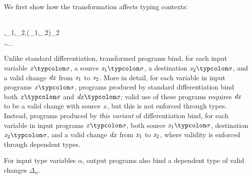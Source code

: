 We first show how the transformation affects typing contexts:
\begin{hscode}\SaveRestoreHook
{}%
%
%
\>[3]{}\Derive{\EmptyContext}\mathrel{=}\EmptyContext{}\<[E]%
\\
\>[3]{}\mathrel{=}\Derive{\Gamma},_{1}\typcolon\sigma,_{2}\typcolon\sigma,\typcolon(_{1},_{2})\in \Delta_2\mean{\sigma}{}\<[E]%
\\
\>[3]{}\Derive{\Gamma,\alpha\typcolon\star}\mathrel{=}\Derive{\Gamma},\alpha\typcolon\star,\Delta_\alpha\typcolon\alpha\to \alpha\to \star{}\<[E]%
\ColumnHook
\end{hscode}\resethooks
Unlike standard differentiation, transformed programs bind, for each input
variable \ensuremath{\Varid{x}\typcolon\sigma},
a source \ensuremath{\Varid{x}_{1}\typcolon\sigma}, a destination \ensuremath{\Varid{x}_{2}\typcolon\sigma}, and a valid change \ensuremath{\Varid{dx}} from
\ensuremath{\Varid{x}_{1}} to \ensuremath{\Varid{x}_{2}}. More in detail, for each variable in input programs \ensuremath{\Varid{x}\typcolon\sigma}, programs produced by standard
differentiation bind both \ensuremath{\Varid{x}\typcolon\sigma} and \ensuremath{\Varid{dx}\typcolon\sigma}; valid use of these
programs requires \ensuremath{\Varid{dx}} to be a valid change with source \ensuremath{\Varid{x}}, but this is not
enforced through types.
Instead, programs produced by \emph{this variant} of differentiation bind,
for each variable in input programs \ensuremath{\Varid{x}\typcolon\sigma}, both source \ensuremath{\Varid{x}_{1}\typcolon\sigma}, destination \ensuremath{\Varid{x}_{2}\typcolon\sigma}, and a valid change \ensuremath{\Varid{dx}} from \ensuremath{\Varid{x}_{1}} to \ensuremath{\Varid{x}_{2}},
where validity is enforced through dependent types.

For input type variables \ensuremath{\alpha}, output programs also bind a dependent type of
valid changes \ensuremath{\Delta_\alpha}.

